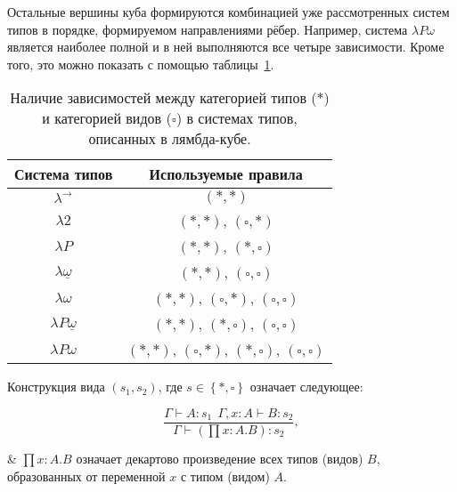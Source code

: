 Остальные вершины куба формируются комбинацией уже рассмотренных систем типов в порядке, формируемом направлениями рёбер.
Например, система $\lambda P \omega$ является наиболее полной и в ней выполняются все четыре зависимости.
Кроме того, это можно показать с помощью таблицы~\ref{tab:set_rules}.

\begin{table}[H]
    \centering
    \caption{Наличие зависимостей между категорией типов ($*$) и категорией видов ($\square$) в системах типов, описанных в лямбда-кубе.}
    \label{tab:set_rules}
    \begin{tabular}{|c|c|}
        \hline
        \textbf{Система типов}        & \textbf{Используемые правила}                                  \\\hline
        $\lambda^{\to}$               & $(*, *)$                                                       \\\hline
        $\lambda 2$                   & $(*, *)$, $(\square, *)$                                       \\\hline
        $\lambda P$                   & $(*, *)$, $(*, \square)$                                       \\\hline
        $\lambda \underline{\omega}$  & $(*, *)$, $(\square, \square)$                                 \\\hline
        $\lambda \omega$              & $(*, *)$, $(\square, *)$, $(\square, \square)$                 \\\hline
        $\lambda P\underline{\omega}$ & $(*, *)$, $(*, \square)$, $(\square, \square)$                 \\\hline
        $\lambda P\omega$             & $(*, *)$, $(\square, *)$, $(*, \square)$, $(\square, \square)$ \\
        \hline
    \end{tabular}
\end{table}

Конструкция вида $(s_1, s_2)$, где $s \in \left\{ *, \square \right\}$ означает следующее:

\begin{equation}
    \label{eq:type_system_rules}
    \frac{
        \Gamma \vdash A: s_1 ~~ \Gamma, x: A \vdash B: s_2
    }{
        \Gamma \vdash (\prod x: A. B): s_2
    },
\end{equation}
\begin{eqrem}
    & $\prod x: A. B$ означает декартово произведение всех типов (видов) $B$, образованных от переменной $x$ с типом (видом) $A$.
\end{eqrem}

